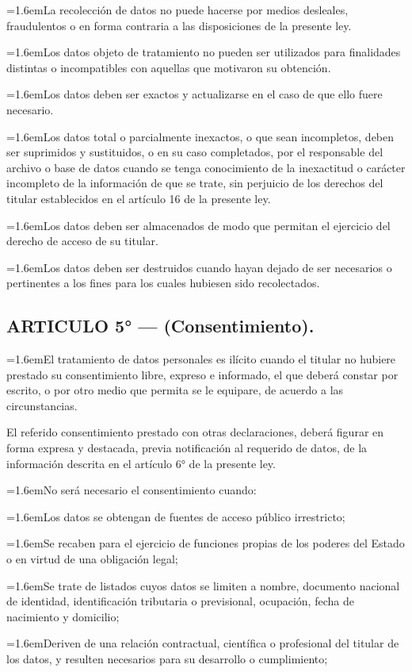 \documentclass[10pt,a4paper]{article}
\newcommand{\articulo}[1]{\subsection{#1}}
\newcommand{\inciso}[2]{\par{\hangindent=1.6em\hangafter=1\makebox[1.6em][l]{#1}#2\par}}
\begin{document}
\inciso{2.}{La recolección de datos no puede hacerse por medios desleales, fraudulentos o en forma contraria a las disposiciones de la presente ley.}

\inciso{3.}{Los datos objeto de tratamiento no pueden ser utilizados para finalidades distintas o incompatibles con aquellas que motivaron su obtención.}

\inciso{4.}{Los datos deben ser exactos y actualizarse en el caso de que ello fuere necesario.}

\inciso{5.}{Los datos total o parcialmente inexactos, o que sean incompletos, deben ser suprimidos y sustituidos, o en su caso completados, por el responsable del archivo o base de datos cuando se tenga conocimiento de la inexactitud o carácter incompleto de la información de que se trate, sin perjuicio de los derechos del titular establecidos en el artículo 16 de la presente ley.}

\inciso{6.}{Los datos deben ser almacenados de modo que permitan el ejercicio del derecho de acceso de su titular.}

\inciso{7.}{Los datos deben ser destruidos cuando hayan dejado de ser necesarios o pertinentes a los fines para los cuales hubiesen sido recolectados.}

\articulo{ARTICULO 5° — (Consentimiento).}
\inciso{1.}{El tratamiento de datos personales es ilícito cuando el titular no hubiere prestado su consentimiento libre, expreso e informado, el que deberá constar por escrito, o por otro medio que permita se le equipare, de acuerdo a las circunstancias.}

El referido consentimiento prestado con otras declaraciones, deberá figurar en forma expresa y destacada, previa notificación al requerido de datos, de la información descrita en el artículo 6° de la presente ley.

\inciso{2.}{No será necesario el consentimiento cuando:}

\inciso{a)}{Los datos se obtengan de fuentes de acceso público irrestricto;}

\inciso{b)}{Se recaben para el ejercicio de funciones propias de los poderes del Estado o en virtud de una obligación legal;}

\inciso{c)}{Se trate de listados cuyos datos se limiten a nombre, documento nacional de identidad, identificación tributaria o previsional, ocupación, fecha de nacimiento y domicilio;}

\inciso{d)}{Deriven de una relación contractual, científica o profesional del titular de los datos, y resulten necesarios para su desarrollo o cumplimiento;}
\end{document}
